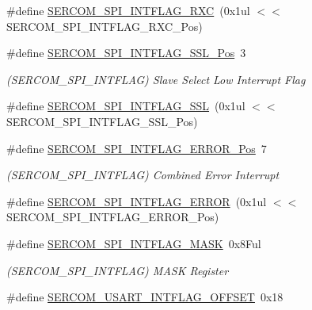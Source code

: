 \begin{DoxyCompactItemize}
\#define \mbox{\hyperlink{group___s_a_m_d21___s_e_r_c_o_m_gaf34eb63b3eb9a846131d88cf087c6a12}{S\+E\+R\+C\+O\+M\+\_\+\+S\+P\+I\+\_\+\+I\+N\+T\+F\+L\+A\+G\+\_\+\+R\+XC}}~(0x1ul $<$$<$ S\+E\+R\+C\+O\+M\+\_\+\+S\+P\+I\+\_\+\+I\+N\+T\+F\+L\+A\+G\+\_\+\+R\+X\+C\+\_\+\+Pos)
\item 
\#define \mbox{\hyperlink{group___s_a_m_d21___s_e_r_c_o_m_ga681eca0d458ada0abe7e06ab04a64845}{S\+E\+R\+C\+O\+M\+\_\+\+S\+P\+I\+\_\+\+I\+N\+T\+F\+L\+A\+G\+\_\+\+S\+S\+L\+\_\+\+Pos}}~3
\begin{DoxyCompactList}\small\item\em (S\+E\+R\+C\+O\+M\+\_\+\+S\+P\+I\+\_\+\+I\+N\+T\+F\+L\+AG) Slave Select Low Interrupt Flag \end{DoxyCompactList}\item 
\#define \mbox{\hyperlink{group___s_a_m_d21___s_e_r_c_o_m_gaaa670c0986f911750316466866c5b9b5}{S\+E\+R\+C\+O\+M\+\_\+\+S\+P\+I\+\_\+\+I\+N\+T\+F\+L\+A\+G\+\_\+\+S\+SL}}~(0x1ul $<$$<$ S\+E\+R\+C\+O\+M\+\_\+\+S\+P\+I\+\_\+\+I\+N\+T\+F\+L\+A\+G\+\_\+\+S\+S\+L\+\_\+\+Pos)
\item 
\#define \mbox{\hyperlink{group___s_a_m_d21___s_e_r_c_o_m_gaaf91dcd712b74597bfebde07e896e5f4}{S\+E\+R\+C\+O\+M\+\_\+\+S\+P\+I\+\_\+\+I\+N\+T\+F\+L\+A\+G\+\_\+\+E\+R\+R\+O\+R\+\_\+\+Pos}}~7
\begin{DoxyCompactList}\small\item\em (S\+E\+R\+C\+O\+M\+\_\+\+S\+P\+I\+\_\+\+I\+N\+T\+F\+L\+AG) Combined Error Interrupt \end{DoxyCompactList}\item 
\#define \mbox{\hyperlink{group___s_a_m_d21___s_e_r_c_o_m_ga51c80f2a7502ea3ccdab45691d88a20a}{S\+E\+R\+C\+O\+M\+\_\+\+S\+P\+I\+\_\+\+I\+N\+T\+F\+L\+A\+G\+\_\+\+E\+R\+R\+OR}}~(0x1ul $<$$<$ S\+E\+R\+C\+O\+M\+\_\+\+S\+P\+I\+\_\+\+I\+N\+T\+F\+L\+A\+G\+\_\+\+E\+R\+R\+O\+R\+\_\+\+Pos)
\item 
\#define \mbox{\hyperlink{group___s_a_m_d21___s_e_r_c_o_m_gafd10b45ae8eecb164e36f4ea5c1d48d7}{S\+E\+R\+C\+O\+M\+\_\+\+S\+P\+I\+\_\+\+I\+N\+T\+F\+L\+A\+G\+\_\+\+M\+A\+SK}}~0x8\+Ful
\begin{DoxyCompactList}\small\item\em (S\+E\+R\+C\+O\+M\+\_\+\+S\+P\+I\+\_\+\+I\+N\+T\+F\+L\+AG) M\+A\+SK Register \end{DoxyCompactList}\item 
\#define \mbox{\hyperlink{group___s_a_m_d21___s_e_r_c_o_m_ga3c163e1c1d889e2dea4d1acede9c0f24}{S\+E\+R\+C\+O\+M\+\_\+\+U\+S\+A\+R\+T\+\_\+\+I\+N\+T\+F\+L\+A\+G\+\_\+\+O\+F\+F\+S\+ET}}~0x18
$$
\end{DoxyCompactItemize}
